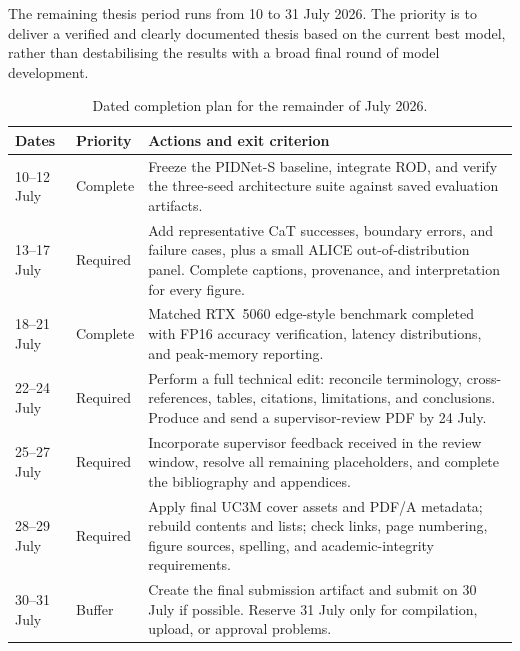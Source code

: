 \documentclass[12pt,a4paper]{report}
\begin{document}
The remaining thesis period runs from 10 to 31 July 2026. The priority is to
deliver a verified and clearly documented thesis based on the current best
model, rather than destabilising the results with a broad final round of model
development.

\begin{table}[H]
\centering
\caption{Dated completion plan for the remainder of July 2026.}
\label{tab:july_plan}
\small
\begin{tabularx}{\textwidth}{@{}p{2.1cm}p{2.0cm}X@{}}
\toprule
\textbf{Dates} & \textbf{Priority} & \textbf{Actions and exit criterion} \\
\midrule
10--12 July & Complete & Freeze the PIDNet-S baseline, integrate ROD, and
verify the three-seed architecture suite against saved evaluation artifacts. \\

13--17 July & Required & Add representative CaT successes, boundary errors,
and failure cases, plus a small ALICE out-of-distribution panel. Complete
captions, provenance, and interpretation for every figure. \\

18--21 July & Complete & Matched RTX~5060 edge-style benchmark completed with
FP16 accuracy verification, latency distributions, and peak-memory reporting. \\

22--24 July & Required & Perform a full technical edit: reconcile terminology,
cross-references, tables, citations, limitations, and conclusions. Produce and
send a supervisor-review PDF by 24 July. \\

25--27 July & Required & Incorporate supervisor feedback received in the review
window, resolve all remaining placeholders, and complete the bibliography and
appendices. \\

28--29 July & Required & Apply final UC3M cover assets and PDF/A metadata;
rebuild contents and lists; check links, page numbering, figure sources,
spelling, and academic-integrity requirements. \\

30--31 July & Buffer & Create the final submission artifact and submit on 30
July if possible. Reserve 31 July only for compilation, upload, or approval
problems. \\
\bottomrule
\end{tabularx}
\end{table}
\end{document}
